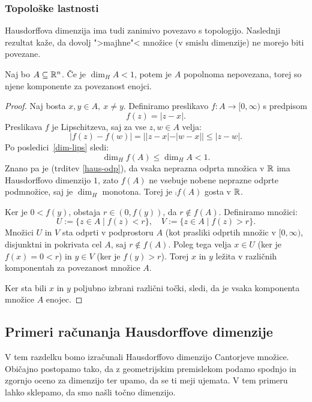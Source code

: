 \subsubsection{Topološke lastnosti}
Hausdorffova dimenzija ima tudi zanimivo povezavo s topologijo. Naslednji rezultat kaže, da dovolj ">majhne"< množice (v smislu dimenzije) ne morejo biti povezane.

\begin{trditev}
    \label{povezanost}
    Naj bo \(A \subseteq \mathbb{R}^n\). Če je \(\dim_H A < 1\), potem je \(A\) popolnoma nepovezana, torej so njene komponente za povezanost enojci.
\end{trditev}

\begin{proof}
    Naj bosta \(x, y \in A, \ x \neq y\). Definiramo preslikavo \(f: A \to [0, \infty)\) s predpisom
    \[f(z) = |z-x|.\]
    Preslikava \(f\) je Lipschitzeva, saj za vse \(z, w \in A\) velja:
    \[
        |f(z) - f(w)| = ||z - x| - |w - x|| \leq |z - w|.
    \]
    Po posledici~\ref{dim-lips} sledi:
    \[
        \dim_H f(A) \leq \dim_H A < 1.
    \]
    Znano pa je (trditev \ref{haus-odp}), da vsaka neprazna odprta množica v \(\mathbb{R}\) ima Hausdorffovo dimenzijo \(1\), zato \(f(A)\) ne vsebuje nobene neprazne odprte podmnožice, saj je \(\dim_H\) monotona. Torej je \(\comp{f(A)}\) gosta v \(\mathbb{R}\).

    Ker je \(0 < f(y)\), obstaja \(r \in (0, f(y))\), da \(r \notin f(A)\). Definiramo množici:
    \[
        U := \{ z \in A \mid f(z) < r \}, \quad V := \{ z \in A \mid f(z) > r \}.
    \]
    Množici \(U\) in \(V\) sta odprti v podprostoru \(A\) (kot prasliki odprtih množic v \([0, \infty)\), disjunktni in pokrivata cel \(A\), saj \(r \notin f(A)\). Poleg tega velja \(x \in U\) (ker je \(f(x) = 0 < r\)) in \(y \in V\) (ker je \(f(y) > r\)). Torej \(x\) in \(y\) ležita v različnih komponentah za povezanost množice \(A\).

    Ker sta bili \(x\) in \(y\) poljubno izbrani različni točki, sledi, da je vsaka komponenta množice \(A\) enojec.
\end{proof}

\subsection{Primeri računanja Hausdorffove dimenzije}
V tem razdelku bomo izračunali Hausdorffovo dimenzijo Cantorjeve množice. Običajno postopamo tako, da z geometrijskim premislekom podamo spodnjo in zgornjo oceno za dimenzijo ter upamo, da se ti meji ujemata. V tem primeru lahko sklepamo, da smo našli točno dimenzijo.

